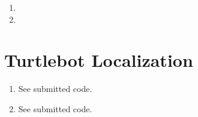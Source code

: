 \documentclass[12pt]{article}
\begin{document}
\begin{enumerate}
\begin{align*}
\begin{array}{cccccccc}
		0 & 0 & 0 & 0 & 1 & \ldots & 0 & 0 \\
		\vdots & \vdots & \vdots & \vdots & \vdots & \ddots & \vdots & \vdots \\
		0 & 0 & 0 & 0 & 0 & \ldots & 1 & 0 \\
		0 & 0 & 0 & 0 & 0 & \ldots & 0 & 1
		\end{array}\right) \\
		G_u = \frac{1}{\omega_t}&\left(\begin{array}{cc}
		\sin(\theta_t) - \sin(\theta_{t-1}) & -\frac{V_t}{\omega_t}(\sin(\theta_t) - \sin(\theta_{t-1})) + V_t\cos(\theta_t)dt \\
		-\cos(\theta_t) + \cos(\theta_{t-1}) & \frac{V_t}{\omega_t}(\cos(\theta_t) - \cos(\theta_{t-1})) + V_t\sin(\theta_t)dt \\
		0 & \omega_tdt \\
		0 & dt \\
		0 & 0 \\
		0 & 0 \\
		\vdots & \vdots \\
		0 & 0 \\
		0 & 0
		\end{array}\right).
	\end{align*}
	where $\theta_t := \theta_{t-1} + \omega_tdt$.
	\item 
	\item 
\end{enumerate}

\section{Turtlebot Localization}
\begin{enumerate}
	\item See submitted code.
	\item See submitted code.
\end{enumerate}
\end{document}
